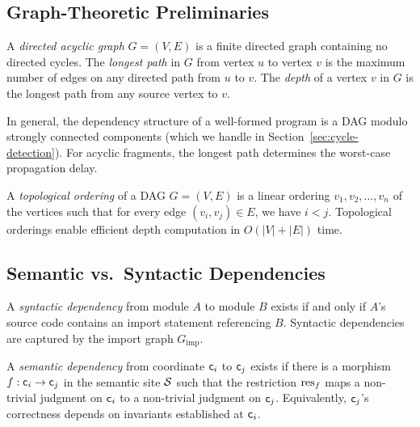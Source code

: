 \documentclass[11pt]{article}
\begin{document}
\subsection{Graph-Theoretic Preliminaries}\label{sec:graph-prelim}

\begin{definition}\label{def:dag}
A \emph{directed acyclic graph} $G = (V, E)$ is a finite directed graph
containing no directed cycles.  The \emph{longest path} in $G$ from vertex $u$
to vertex $v$ is the maximum number of edges on any directed path from $u$
to $v$.  The \emph{depth} of a vertex $v$ in $G$ is the longest path from
any source vertex to $v$.
\end{definition}

In general, the dependency structure of a well-formed program is a DAG modulo
strongly connected components (which we handle in
Section~\ref{sec:cycle-detection}).  For acyclic fragments, the longest
path determines the worst-case propagation delay.

\begin{definition}\label{def:topo-order}
A \emph{topological ordering} of a DAG $G = (V, E)$ is a linear ordering
$v_1, v_2, \ldots, v_n$ of the vertices such that for every edge
$(v_i, v_j) \in E$, we have $i < j$.  Topological orderings enable
efficient depth computation in $O(|V| + |E|)$ time.
\end{definition}

\subsection{Semantic vs.\ Syntactic Dependencies}\label{sec:sem-syn-deps}

\begin{definition}\label{def:syn-dep}
A \emph{syntactic dependency} from module $A$ to module $B$ exists if and
only if $A$'s source code contains an import statement referencing $B$.
Syntactic dependencies are captured by the import graph
$G_{\mathrm{imp}}$.
\end{definition}

\begin{definition}\label{def:sem-dep}
A \emph{semantic dependency} from coordinate $\mathsf{c}_i$ to $\mathsf{c}_j$
exists if there is a morphism $f : \mathsf{c}_i \to \mathsf{c}_j$ in the semantic
site $\mathcal{S}$ such that the restriction $\mathrm{res}_f$ maps a non-trivial judgment
on $\mathsf{c}_i$ to a non-trivial judgment on $\mathsf{c}_j$.  Equivalently,
$\mathsf{c}_j$'s correctness depends on invariants established at $\mathsf{c}_i$.
\end{definition}
\end{document}

